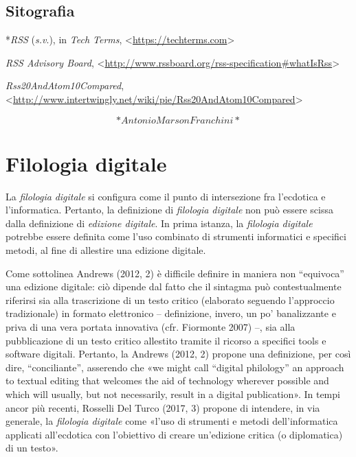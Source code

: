 \documentclass[
  b5paper,
  twoside,
  11pt,
  chapterprefix=false,
  bibliography=totocnumbered,
  parskip=0]{scrbook}
\begin{document}
\hypertarget{sitografia-11}{%
\section*{Sitografia}\label{sitografia-11}}

*\emph{RSS} (\emph{s.v}.), in \emph{Tech Terms},
\textless{}{\href{https://techterms.com/}{https://techterms.com}\textgreater{}}

\emph{RSS Advisory Board},
\textless{}{\url{http://www.rssboard.org/rss-specification\#whatIsRss}\textgreater{}}

\emph{Rss20AndAtom10Compared},
\textless{}{\url{http://www.intertwingly.net/wiki/pie/Rss20AndAtom10Compared}\textgreater{}}

\[*Antonio Marson Franchini*\]

\hypertarget{filologia-digitale}{%
\chapter{Filologia digitale}\label{filologia-digitale}}

La \emph{filologia} \emph{digitale} si configura come il punto di intersezione fra
l'ecdotica e l'informatica. Pertanto, la definizione di \emph{filologia
digitale} non può essere scissa dalla definizione di \emph{edizione
digitale}. In prima istanza, la \emph{filologia digitale} potrebbe essere
definita come l'uso combinato di strumenti informatici e specifici
metodi, al fine di allestire una edizione digitale.

Come sottolinea Andrews (2012, 2) è difficile definire in maniera non
\enquote{equivoca} una edizione digitale: ciò dipende dal fatto che il sintagma
può contestualmente riferirsi sia alla trascrizione di un testo critico
(elaborato seguendo l'approccio tradizionale) in formato elettronico --
definizione, invero, un po' banalizzante e priva di una vera portata
innovativa (cfr. Fiormonte 2007) --, sia alla pubblicazione di un testo
critico allestito tramite il ricorso a specifici tools e software
digitali. Pertanto, la Andrews (2012, 2) propone una definizione, per
così dire, \enquote{conciliante}, asserendo che «we might call \enquote{digital
philology} an approach to textual editing that welcomes the aid of
technology wherever possible and which will usually, but not
necessarily, result in a digital publication». In tempi ancor più
recenti, Rosselli Del Turco (2017, 3) propone di intendere, in via
generale, la \emph{filologia digitale} come «l'uso di strumenti e metodi
dell'informatica applicati all'ecdotica con l'obiettivo di creare
un'edizione critica (o diplomatica) di un testo».
\end{document}
